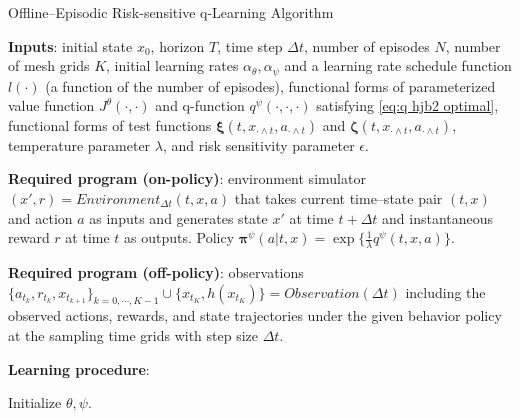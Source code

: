 \begin{algorithm}[htbp]
	\caption{Offline--Episodic Risk-sensitive q-Learning Algorithm}
	\textbf{Inputs}: initial state $x_0$,  horizon $T$, time step $\Delta t$, number of episodes $N$, number of mesh grids $K$, initial learning rates $\alpha_{\theta},\alpha_{\psi}$ and a learning rate schedule function $l(\cdot)$ (a function of the number of episodes), functional forms  of parameterized  value function $J^{\theta}(\cdot,\cdot)$ and  q-function $q^{\psi}(\cdot,\cdot,\cdot)$ satisfying \eqref{eq:q hjb2 optimal}, functional forms of test functions $\bm{\xi}(t,x_{\cdot \wedge t},a_{\cdot \wedge t})$ and $\bm{\zeta}(t,x_{\cdot \wedge t},a_{\cdot \wedge t})$, temperature parameter $\lambda$, and risk sensitivity parameter $\epsilon$.
	
	
	\textbf{Required program (on-policy)}: environment simulator $(x',r) = \textit{Environment}_{\Delta t}(t,x,a)$ that takes current time--state pair $(t,x)$ and action $a$ as inputs and generates state $x'$ at time $t+\Delta t$ and  instantaneous reward $r$ at time $t$ as outputs. Policy $\bm\pi^{\psi}(a|t,x) = \exp\{  \frac{1}{\lambda}q^{\psi}(t,x,a) \}$.
	
	\textbf{Required program (off-policy)}: observations $ \{a_{t_k}, r_{t_{k}}, x_{t_{k+1}}\}_{k = 0,\cdots, K-1}\cup \{ x_{t_K}, h(x_{t_K})\} = \textit{Observation}(\Delta t)$ including the observed actions, rewards, and state trajectories under the given behavior policy  at the sampling time grids with step size $\Delta t$.
	
	
	\textbf{Learning procedure}:
	\begin{algorithmic}
		\State Initialize $\theta,\psi$.
		 
\end{algorithmic}
\end{algorithm}
